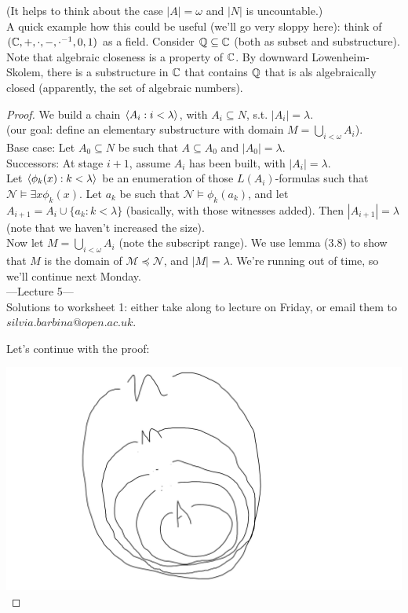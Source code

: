 \documentclass[a4paper]{article}
\begin{document}
\begin{thm}
    (It helps to think about the case $|A| = \omega$ and $|N|$ is uncountable.)\\
    A quick example how this could be useful (we'll go very sloppy here): think of $(\mathbb{C},+,\cdot,-,\cdot^{-1},0,1)$ as a field. Consider $\mathbb{Q} \subseteq \mathbb{C}$ (both as subset and substructure). Note that algebraic closeness is a property of $\mathbb{C}$. By downward L$\ddot{o}$wenheim-Skolem, there is a substructure in $\mathbb{C}$ that contains $\mathbb{Q}$ that is als algebraically closed (apparently, the set of algebraic numbers).
    \begin{proof}
        We build a chain $\langle A_i : i < \lambda \rangle$, with $A_i \subseteq N$, s.t. $|A_i| = \lambda$.\\
        (our goal: define an elementary substructure with domain $M=\bigcup_{i < \omega} A_i$).\\
        Base case: Let $A_0 \subseteq N$ be such that $A \subseteq A_0$ and $|A_0| = \lambda$.\\
        Successors: At stage $i+1$, assume $A_i$ has been built, with $|A_i| = \lambda$.\\
        Let $\langle \phi_k(x): k < \lambda \rangle$ be an enumeration of those $L(A_i)$-formulas such that $\mathcal{N} \vDash \exists x \phi_k(x)$. Let $a_k$ be such that $\mathcal{N} \vDash \phi_k(a_k)$, and let $A_{i+1} = A_i \cup \{a_k: k < \lambda\}$ (basically, with those witnesses added). Then $|A_{i+1}| = \lambda$ (note that we haven't increased the size).\\
        Now let $M = \bigcup_{i < \omega} A_i$ (note the subscript range). We use lemma (3.8) to show that $M$ is the domain of $\mathcal{M} \preccurlyeq \mathcal{N}$, and $|M| = \lambda$.
        We're running out of time, so we'll continue next Monday.\\
        
        ---Lecture 5---\\
        Solutions to worksheet 1: either take along to lecture on Friday, or email them to $silvia.barbina@open.ac.uk$.

        Let's continue with the proof:

        \includegraphics[scale=0.5]{image/Model_02.png}


\end{proof}
\end{thm}
\end{document}
